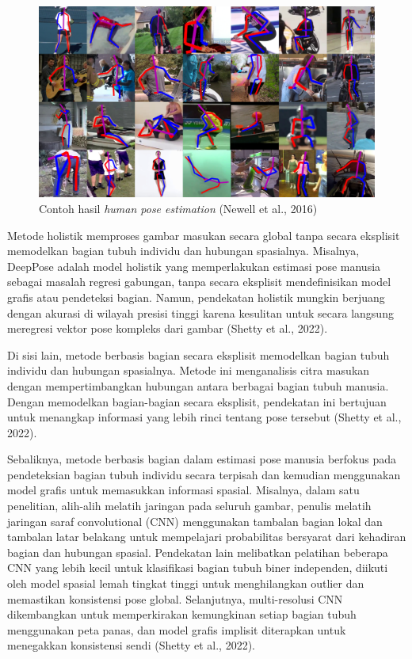 \begin{figure}[H]
  \centering
  \includegraphics[scale=0.95]{gambar/humanpose.png}
  \caption{Contoh hasil \emph{human pose estimation} (Newell et al., 2016)}
  \label{fig:humanposeestimation}
\end{figure}

Metode holistik memproses gambar masukan secara global tanpa secara eksplisit memodelkan bagian tubuh individu dan hubungan spasialnya. Misalnya, DeepPose adalah model holistik yang memperlakukan estimasi pose manusia sebagai masalah regresi gabungan, tanpa secara eksplisit mendefinisikan model grafis atau pendeteksi bagian. Namun, pendekatan holistik mungkin berjuang dengan akurasi di wilayah presisi tinggi karena kesulitan untuk secara langsung meregresi vektor pose kompleks dari gambar (Shetty et al., 2022).

Di sisi lain, metode berbasis bagian secara eksplisit memodelkan bagian tubuh individu dan hubungan spasialnya. Metode ini menganalisis citra masukan dengan mempertimbangkan hubungan antara berbagai bagian tubuh manusia. Dengan memodelkan bagian-bagian secara eksplisit, pendekatan ini bertujuan untuk menangkap informasi yang lebih rinci tentang pose tersebut (Shetty et al., 2022).

Sebaliknya, metode berbasis bagian dalam estimasi pose manusia berfokus pada pendeteksian bagian tubuh individu secara terpisah dan kemudian menggunakan model grafis untuk memasukkan informasi spasial. Misalnya, dalam satu penelitian, alih-alih melatih jaringan pada seluruh gambar, penulis melatih jaringan saraf convolutional (CNN) menggunakan tambalan bagian lokal dan tambalan latar belakang untuk mempelajari probabilitas bersyarat dari kehadiran bagian dan hubungan spasial. Pendekatan lain melibatkan pelatihan beberapa CNN yang lebih kecil untuk klasifikasi bagian tubuh biner independen, diikuti oleh model spasial lemah tingkat tinggi untuk menghilangkan outlier dan memastikan konsistensi pose global. Selanjutnya,  multi-resolusi CNN dikembangkan untuk memperkirakan kemungkinan setiap bagian tubuh menggunakan peta panas, dan model grafis implisit diterapkan untuk menegakkan konsistensi sendi (Shetty et al., 2022).

